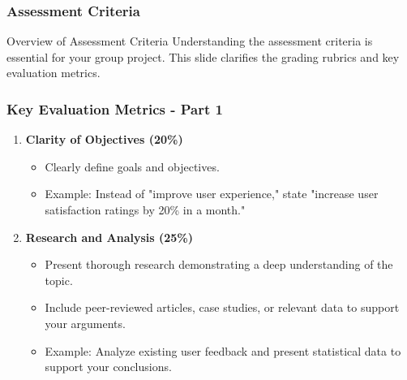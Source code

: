 \documentclass[aspectratio=169]{beamer}
\begin{document}
\begin{frame}[fragile]
    \frametitle{Assessment Criteria}
    \begin{block}{Overview of Assessment Criteria}
    Understanding the assessment criteria is essential for your group project. This slide clarifies the grading rubrics and key evaluation metrics.
    \end{block}
\end{frame}

\begin{frame}[fragile]
    \frametitle{Key Evaluation Metrics - Part 1}
    \begin{enumerate}
        \item \textbf{Clarity of Objectives (20\%)}
        \begin{itemize}
            \item Clearly define goals and objectives.
            \item Example: Instead of "improve user experience," state "increase user satisfaction ratings by 20\% in a month."
        \end{itemize}
        
        \item \textbf{Research and Analysis (25\%)}
        \begin{itemize}
            \item Present thorough research demonstrating a deep understanding of the topic.
            \item Include peer-reviewed articles, case studies, or relevant data to support your arguments.
            \item Example: Analyze existing user feedback and present statistical data to support your conclusions.
        \end{itemize}
    \end{enumerate}
\end{frame}
\end{document}
